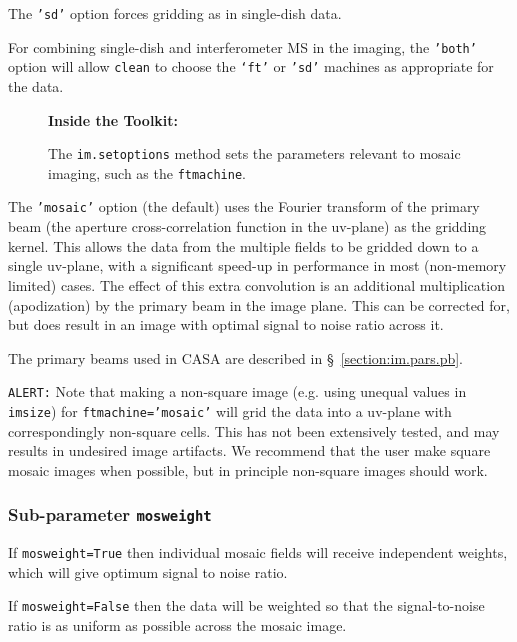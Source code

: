 The {\tt 'sd'} option forces gridding as in single-dish data.

For combining single-dish and interferometer MS in the imaging, the
{\tt 'both'} option will allow {\tt clean} to choose the {\tt `ft'}
or {\tt 'sd'} machines as appropriate for the data.

\begin{wrapfigure}{r}{2.5in}
  \begin{boxedminipage}{2.5in}
     \centerline{\bf Inside the Toolkit:}
     The {\tt im.setoptions} method sets the parameters relevant to
     mosaic imaging, such as the {\tt ftmachine}.
  \end{boxedminipage}
\end{wrapfigure}

The {\tt 'mosaic'} option (the default) uses the Fourier transform of the
primary beam (the aperture cross-correlation function in the uv-plane) as
the gridding kernel.  This allows the data from the multiple fields to be
gridded down to a single uv-plane, with a significant speed-up in 
performance in most (non-memory limited) cases.  The effect of this extra
convolution is an additional multiplication (apodization) by the primary
beam in the image plane.  This can be corrected for, but does result in
an image with optimal signal to noise ratio across it.

The primary beams used in CASA are described in \S~\ref{section:im.pars.pb}.

{\tt ALERT:} Note that making a non-square image (e.g. using
unequal values in {\tt imsize}) for {\tt ftmachine='mosaic'} will grid 
the data into a uv-plane with correspondingly non-square cells.  This
has not been extensively tested, and may results in undesired image
artifacts.  We recommend that the user make square mosaic images when
possible, but in principle non-square images should work.

\subsubsection{Sub-parameter {\tt mosweight} }
\label{section:im.imagermode.mosaic.mosweight}

If {\tt mosweight=True} then individual mosaic fields will receive independent 
weights, which will give optimum signal to noise ratio. 

If {\tt mosweight=False} then the data will be
weighted so that the signal-to-noise ratio is as uniform as possible
across the mosaic image.

